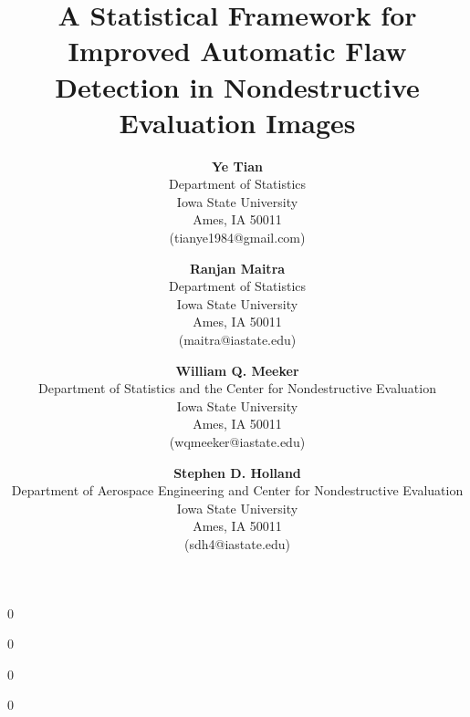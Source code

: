 \documentclass[12pt]{article}
\newcommand{\blinded}{0}
\begin{document}


\blinded
{
}
\fi
{}\blinded
{
}
\fi

\title{\vspace{-0.8in} 
A Statistical Framework for Improved Automatic Flaw Detection
  in Nondestructive Evaluation Images} 
\blinded
{
\author{
  \vspace{-0.1in}
  {\bf Ye Tian}\\
  \vspace{-0.2in}
  Department of Statistics\\
    Iowa State University\\
    Ames, IA 50011\\
    (tianye1984@gmail.com)\\
\and
    \vspace{-0.2in}
    {\bf Ranjan Maitra}\\
    \vspace{-0.2in}
    Department of Statistics\\
    Iowa State University\\
    Ames, IA 50011\\
    (maitra@iastate.edu)
    \and
    \vspace{-0.2in}
           {\bf William Q. Meeker}\\
           \vspace{-0.2in}
           Department of Statistics and the Center for Nondestructive
           Evaluation\\
           Iowa State University\\
           Ames, IA 50011\\
           (wqmeeker@iastate.edu)
           \and
           \vspace{-0.2in}
                  {\bf Stephen D. Holland}\\
                  \vspace{-0.2in}
                  Department of Aerospace Engineering and Center for Nondestructive Evaluation\\
                  Iowa State University\\
                  Ames, IA 50011\\
                  (sdh4@iastate.edu)
}
\date{\vspace{-0.5in}}
}
\fi
{}\blinded
    {
      \date{\vspace{-1.2in}}
      \renewcommand{\baselinestretch}{1.4}\normalsize
    }
\end{document}
